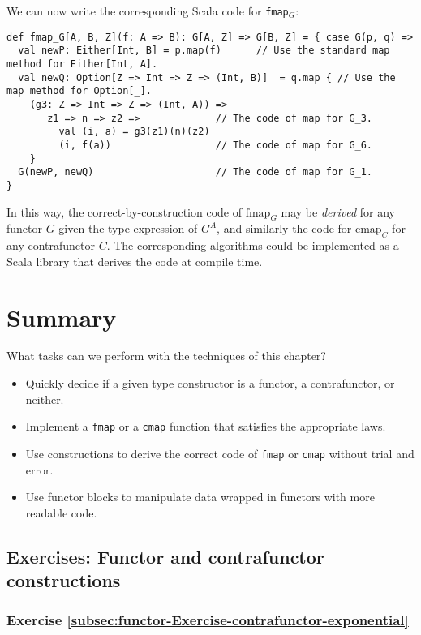 We can now write the corresponding Scala code for \lstinline!fmap!$_{G}$:
\begin{lstlisting}
def fmap_G[A, B, Z](f: A => B): G[A, Z] => G[B, Z] = { case G(p, q) =>
  val newP: Either[Int, B] = p.map(f)      // Use the standard map method for Either[Int, A].
  val newQ: Option[Z => Int => Z => (Int, B)]  = q.map { // Use the map method for Option[_].
    (g3: Z => Int => Z => (Int, A)) => 
       z1 => n => z2 =>             // The code of map for G_3.
         val (i, a) = g3(z1)(n)(z2)
         (i, f(a))                  // The code of map for G_6.
    }
  G(newP, newQ)                     // The code of map for G_1.
}
\end{lstlisting}
In this way, the correct-by-construction code of $\text{fmap}_{G}$
may be \emph{derived} for any functor $G$ given the type expression
of $G^{A}$, and similarly the code for $\text{cmap}_{C}$ for any
contrafunctor $C$. The corresponding algorithms could be implemented
as a Scala library that derives the code at compile time.

\section{Summary}

What tasks can we perform with the techniques of this chapter?
\begin{itemize}
\item Quickly decide if a given type constructor is a functor, a contrafunctor,
or neither.
\item Implement a \lstinline!fmap! or a \lstinline!cmap! function that
satisfies the appropriate laws.
\item Use constructions to derive the correct code of \lstinline!fmap!
or \lstinline!cmap! without trial and error.
\item Use functor blocks to manipulate data wrapped in functors with more
readable code.
\end{itemize}

\subsection{Exercises: Functor and contrafunctor constructions }

\subsubsection{Exercise \label{subsec:functor-Exercise-contrafunctor-exponential}\ref{subsec:functor-Exercise-contrafunctor-exponential}}

